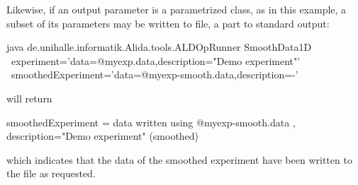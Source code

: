 Likewise, if an output parameter is a parametrized class, as in this example, a subset of
its parameters may be written to file, a part to standard output:
\begin{code}
java de.unihalle.informatik.Alida.tools.ALDOpRunner SmoothData1D \
        experiment='{data=@myexp.data,description="Demo experiment"}' \
        smoothedExperiment='{data=@myexp-smooth.data,description=-}'
\end{code}
will return
\begin{code}
smoothedExperiment = { data written using @myexp-smooth.data , 
          description="Demo experiment" (smoothed) }
\end{code}
which indicates that the data of the smoothed experiment have been written
to the file  as requested.

